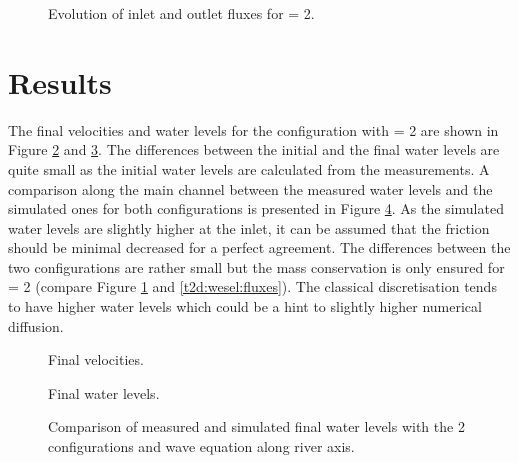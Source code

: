 \begin{figure} [h!]
\centering
{}
\caption{Evolution of inlet and outlet fluxes for  = 2.}
\label{t2d:wesel:fluxes_pos}
\end{figure}

\section{Results}

The final velocities and water levels for the configuration with
 = 2 are
shown in Figure \ref{t2d:wesel:velocity} and \ref{t2d:wesel:free_surface}.
The differences between the initial and the final water levels are quite small
as the initial water levels are calculated from the measurements.
A comparison along the main channel between the measured water levels and the
simulated ones for both configurations is presented in Figure
\ref{t2d:wesel:diff_waterlevels}.
As the simulated water levels are slightly higher at the inlet, it can be
assumed that the friction should be minimal decreased for a perfect agreement.
The differences between the two configurations are rather small but the mass
conservation is only ensured for  = 2
(compare Figure \ref{t2d:wesel:fluxes_pos} and \ref{t2d:wesel:fluxes}).
The classical discretisation tends to have higher water levels which could be a
hint to slightly higher numerical diffusion. 


\begin{figure} [h!]
\centering
{}
\caption{Final velocities.}
\label{t2d:wesel:velocity}
\end{figure}

\begin{figure} [h!]
\centering
{}
\caption{Final water levels.}
\label{t2d:wesel:free_surface}
\end{figure}

\begin{figure} [h!]
\centering
{}
\caption{Comparison of measured and simulated final water levels with the 2 configurations and wave equation along river axis.}
\label{t2d:wesel:diff_waterlevels}
\end{figure}

